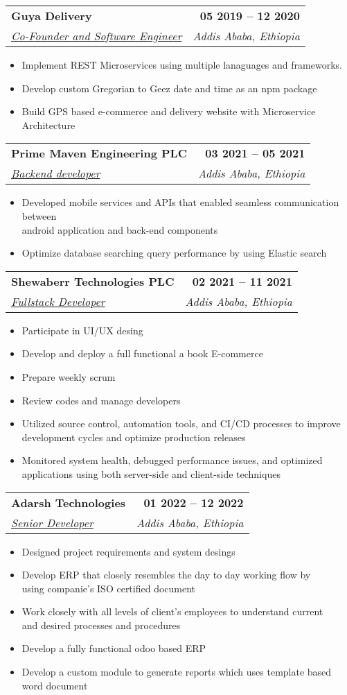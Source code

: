 \documentclass[letterpaper,11pt]{article}
\makeatletter
\newcommand{\resumeItem}[1]{
  \item\small{
    {#1 \vspace{2pt}}
  }
}
\newcommand{\resumeSubheading}[4]{
  \vspace{3pt}\item
    \begin{tabular*}{1.0\textwidth}[t]{l@{\extracolsep{\fill}}r}
      \textbf{\large#1} &  \textbf{\small #2} \\
      \textit{\large#3} & \textit{\small #4} \\
      
    \end{tabular*}\vspace{-1pt}
}
\newcommand{\resumeItemListStart}{\begin{itemize}}
\newcommand{\resumeItemListEnd}{\end{itemize}\vspace{-5pt}}
\makeatother
\begin{document}
      
    \resumeSubheading
      {Guya Delivery}{05 2019 -- 12 2020} 
      {\underline{Co-Founder and Software Engineer}}{Addis Ababa, Ethiopia}
      \resumeItemListStart
      	\resumeItem{\normalsize{Implement REST Microservices using multiple lanaguages and frameworks.}}
      	\resumeItem{\normalsize{Develop custom Gregorian to Geez date and time as an npm package}}
  		\resumeItem{\normalsize{Build GPS based e-commerce and delivery website with Microservice Architecture}}
      \resumeItemListEnd
	
	\resumeSubheading
      {Prime Maven Engineering PLC}{03 2021 -- 05 2021} 
      {\underline{Backend developer}}{Addis Ababa, Ethiopia}
      \resumeItemListStart
        \resumeItem{\normalsize{Developed mobile services and APIs that enabled seamless communication between \\ android application and back-end components}}
        \resumeItem{\normalsize{Optimize database searching query performance by using Elastic search}}
      \resumeItemListEnd    
      
      \resumeSubheading
      {Shewaberr Technologies PLC}{02 2021 -- 11 2021} 
      {\underline{Fullstack Developer}}{Addis Ababa, Ethiopia}
      \resumeItemListStart
        \resumeItem{\normalsize{Participate in UI/UX desing}}
        \resumeItem{\normalsize{Develop and deploy a full functional a book E-commerce}}
        \resumeItem{\normalsize{Prepare weekly scrum}}
        \resumeItem{\normalsize{Review codes and manage developers}}
        \resumeItem{\normalsize{Utilized source control, automation tools, and CI/CD processes to improve \\ development cycles and optimize production releases}}
        \resumeItem{\normalsize{Monitored system health, debugged performance issues, and optimized \\ applications using both server-side and client-side techniques}}
      \resumeItemListEnd     
      
      \newpage
      \resumeSubheading
      {Adarsh Technologies}{01 2022 -- 12 2022} 
      {\underline{Senior Developer}}{Addis Ababa, Ethiopia}
      \resumeItemListStart
        \resumeItem{\normalsize{Designed project requirements and system desings}}
        \resumeItem{\normalsize{Develop ERP that closely resembles the day to day working flow by \\ using companie's ISO certified document }}
        \resumeItem{\normalsize{Work closely with all levels of client's employees to understand current \\ and desired processes and procedures }}
        \resumeItem{\normalsize{Develop a fully functional odoo based ERP}}
        \resumeItem{\normalsize{Develop a custom module to generate reports which uses template based word document}}
      \resumeItemListEnd 
      
\end{document}
